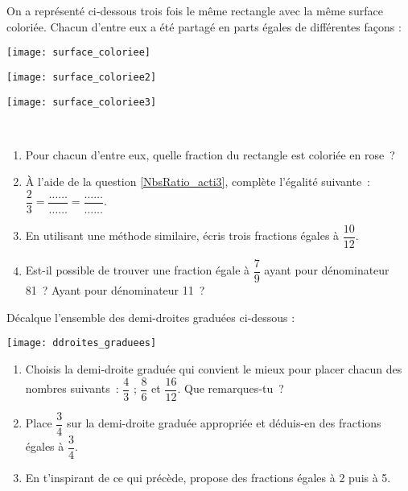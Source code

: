 \begin{activite}

\begin{partie}
On a représenté ci‑dessous trois fois le même rectangle avec la même surface coloriée. Chacun d'entre eux a été partagé en parts égales de différentes façons : \\[0.5em]
\begin{minipage}[c]{0.32\linewidth}
 \texttt{[image: surface\_coloriee]}
\end{minipage} \hfill%
\begin{minipage}[c]{0.32\linewidth}
 \texttt{[image: surface\_coloriee2]}
 \end{minipage} \hfill%
\begin{minipage}[c]{0.32\linewidth} 
 \texttt{[image: surface\_coloriee3]}
 \end{minipage} \\
\begin{enumerate}
 \item Pour chacun d'entre eux, quelle fraction du rectangle est coloriée en rose ? \label{NbsRatio_acti3}
 \item À l'aide de la question \ref{NbsRatio_acti3}, complète l'égalité suivante : $\dfrac{2}{3} = \dfrac{\ldots \ldots}{\ldots \ldots} = \dfrac{\ldots \ldots}{\ldots \ldots}$.
 \item En utilisant une méthode similaire, écris trois fractions égales à $\dfrac{10}{12}$.
 \item Est-il possible de trouver une fraction égale à $\dfrac{7}{9}$ ayant pour dénominateur 81 ? Ayant pour dénominateur 11 ? 
 \end{enumerate}
\end{partie}

\begin{partie}
Décalque l'ensemble des demi-droites graduées ci‑dessous : \\[0.5em]
\begin{center} \texttt{[image: ddroites\_graduees]} \end{center}
\begin{enumerate}
 \item Choisis la demi‑droite graduée qui convient le mieux pour placer chacun des nombres suivants : $\dfrac{4}{3}$ ; $\dfrac{8}{6}$ et $\dfrac{16}{12}$. Que remarques‑tu ?
 \item Place $\dfrac{3}{4}$ sur la demi-droite graduée appropriée et déduis-en des fractions égales à $\dfrac{3}{4}$.
 \item En t'inspirant de ce qui précède, propose des fractions égales à 2 puis à 5.
 \end{enumerate}
\end{partie}


\end{activite}
